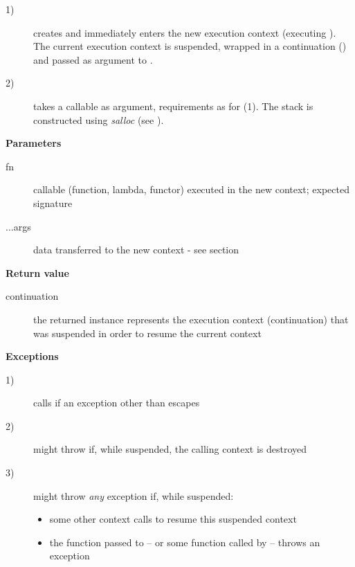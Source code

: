 \begin{description}
    \item[1)] creates and immediately enters the new execution context
              (executing ). The current execution context is suspended,
              wrapped in a continuation (\cont) and passed as argument to
              .
    \item[2)] takes a callable as argument, requirements as for (1). The stack
              is constructed using \emph{salloc}
              (see ).
\end{description}

{\bfseries Parameters}
\begin{description}
    \item[fn]      callable (function, lambda, functor) executed in the new
                   context; expected signature  
    \item[...args] data transferred to the new context - see section
                   \\
\end{description}

{\bfseries Return value}
\begin{description}
    \item[continuation] the returned instance represents the execution context
                        (continuation) that was suspended in order to
                        resume the current context
\end{description}

{\bfseries Exceptions}
\begin{description}
    \item[1)] calls  if an exception other
              than \unwindex escapes \entryfn\ 
    \item[2)] \callcc might throw \unwindex if,
              while suspended, the calling context is destroyed
    \item[3)] \callcc might throw \emph{any} exception if, while
              suspended:
        \begin{itemize}
            \item some other context calls \resumewith to resume
              this suspended context
            \item the function  passed to \resumewith --
              or some function called by  -- throws an exception
        \end{itemize}
\end{description}

